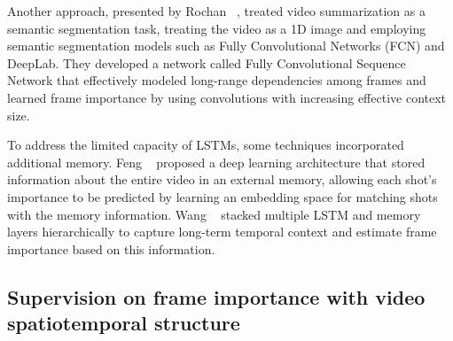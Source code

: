 Another approach, presented by Rochan \etal~\cite{rochan2018sequence}, treated video summarization as a semantic segmentation task, treating the video as a 1D image and employing semantic segmentation models such as Fully Convolutional Networks (FCN) and DeepLab. They developed a network called Fully Convolutional Sequence Network that effectively modeled long-range dependencies among frames and learned frame importance by using convolutions with increasing effective context size.

To address the limited capacity of LSTMs, some techniques incorporated additional memory. Feng \etal~\cite{feng2018memory} proposed a deep learning architecture that stored information about the entire video in an external memory, allowing each shot's importance to be predicted by learning an embedding space for matching shots with the memory information. Wang \etal~\cite{wang2019stacked} stacked multiple LSTM and memory layers hierarchically to capture long-term temporal context and estimate frame importance based on this information.


\subsection{Supervision on frame importance with video spatiotemporal structure}
\label{subsec:rel-sup-spatiotemporal}





